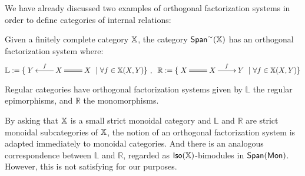 We have already discussed two examples of orthogonal factorization systems in order to define categories of internal relations:
\begin{example}
Given a finitely complete category $\mathbb{X}$, the category $\mathsf{Span}^\sim(\mathbb{X})$ has an orthogonal factorization system where:
$$\mathbb{L}:=
\{\xymatrix{Y & X \ar@{=}[r] \ar[l]_{f } & X}    \  | \ \forall f \in \X(X,Y)  \}\ , \hspace*{.2cm}
\mathbb{R}:=
\{ \xymatrix{X & X \ar@{=}[l] \ar[r]^{f } & Y}    \  | \ \forall f \in \X(X,Y) \}
$$
\end{example}
\begin{example}
Regular categories have orthogonal factorization systems given by $\mathbb{L}$ the regular epimorphisms, and $\mathbb R$ the monomorphisms.
\end{example}
By asking that $\mathbb{X}$ is a small strict monoidal category and  $\mathbb{L}$ and $\mathbb{R}$ are strict monoidal subcategories of $\mathbb{X}$, the notion of an orthogonal factorization system is adapted immediately to monoidal categories. And there is an analogous correspondence  between $\mathbb{L}$ and $\mathbb{R}$, regarded as ${\sf Iso}(\mathbb{X})$-bimodules in $\mathsf{Span}({\sf Mon})$.  However, this is not satisfying for our purposes.

